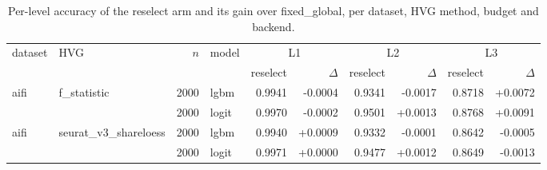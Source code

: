 \begin{table}[t]
\centering
\small
\begin{tabular}{llrlrrrrrr}
\toprule
dataset & HVG & $n$ & model & \multicolumn{2}{c}{L1} & \multicolumn{2}{c}{L2} & \multicolumn{2}{c}{L3} \\
 & & & & reselect & $\Delta$ & reselect & $\Delta$ & reselect & $\Delta$ \\
\midrule
aifi & f\_statistic & 2000 & lgbm & 0.9941 & -0.0004 & 0.9341 & -0.0017 & 0.8718 & +0.0072 \\
 &  & 2000 & logit & 0.9970 & -0.0002 & 0.9501 & +0.0013 & 0.8768 & +0.0091 \\
\addlinespace
aifi & seurat\_v3\_shareloess & 2000 & lgbm & 0.9940 & +0.0009 & 0.9332 & -0.0001 & 0.8642 & -0.0005 \\
 &  & 2000 & logit & 0.9971 & +0.0000 & 0.9477 & +0.0012 & 0.8649 & -0.0013 \\
\bottomrule
\end{tabular}
\caption{Per-level accuracy of the reselect arm and its gain over fixed\_global, per dataset, HVG method, budget and backend.}
\label{tab:runs-accuracy}
\end{table}